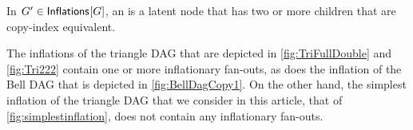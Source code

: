 {%



\begin{definition}
In $G'\in{\operatorname{\mathsf{Inflations}}_{}}\lbrack G\rbrack$, an  is a latent node that has two or more children that are copy-index equivalent.  
\end{definition}

The inflations of the triangle DAG that are depicted in \cref{fig:TriFullDouble} and \cref{fig:Tri222} contain one or more inflationary fan-outs, as does the inflation of the Bell DAG that is depicted in \cref{fig:BellDagCopy1}.  On the other hand, the simplest inflation of the triangle DAG that we consider in this article, that of \cref{fig:simplestinflation}, does not contain any inflationary fan-outs.


}
